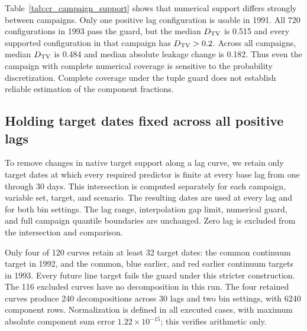 \begin{table}[H]
\centering
\caption{Native date counts and positive lag support by campaign.
Each campaign has 720 positive lag configurations per bin setting.
$N_{\rm line}$ is the number of native dates for each line series and
$N_F$ is the continuum count. $N_{\rm usable}$ applies to the earlier
support that changes with lag. The last column gives the range of retained
date counts after intersection across all positive lags in each curve.}
\label{tab:cr_campaign_support}
\small

\end{table}

Table~\ref{tab:cr_campaign_support} shows that numerical support differs
strongly between campaigns. Only one positive lag configuration is usable
in 1991. All 720 configurations in 1993 pass the guard, but the median
$D_{\rm TV}$ is 0.515 and every supported configuration in that campaign
has $D_{\rm TV}>0.2$. Across all campaigns, median $D_{\rm TV}$ is 0.484
and median absolute leakage change is 0.182. Thus even the campaign with
complete numerical coverage is sensitive to the probability discretization.
Complete coverage under the tuple guard does not establish reliable
estimation of the component fractions.

\subsection{Holding target dates fixed across all positive lags}

To remove changes in native target support along a lag curve, we retain
only target dates at which every required predictor is finite at every
base lag from one through 30 days. This intersection is computed separately
for each campaign, variable set, target, and scenario. The resulting dates
are used at every lag and for both bin settings. The lag range, interpolation
gap limit, numerical guard, and full campaign quantile boundaries are
unchanged. Zero lag is excluded from the intersection and comparison.

Only four of 120 curves retain at least 32 target dates: the common
continuum target in 1992, and the common, blue earlier, and red earlier
continuum targets in 1993. Every future line target fails the guard under
this stricter construction. The 116 excluded curves have no decomposition
in this run. The four retained curves produce 240 decompositions across
30 lags and two bin settings, with 6240 component rows.
Normalization is defined in all executed cases, with maximum absolute
component sum error $1.22\times10^{-15}$; this verifies arithmetic only.

